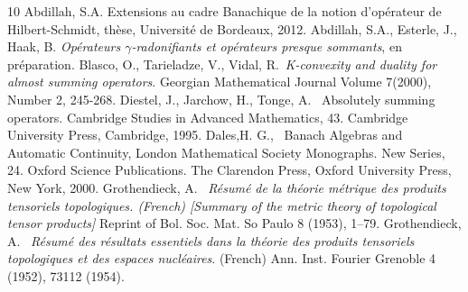 \documentclass{smfart}
\theoremstyle{plain}
\theoremstyle{definition}
\newcommand{\err}{\mathrm{R}}
\begin{document}
\begin{thebibliography}{10}
 Abdillah, S.A. Extensions au cadre Banachique de la notion d'opérateur de Hilbert-Schmidt, thèse, Université de Bordeaux, 2012.
 Abdillah, S.A., Esterle, J., Haak, B. {\it Opérateurs $\gamma$-radonifiants et opérateurs presque sommants}, en préparation.
 Blasco, O., Tarieladze, V., Vidal, R.\ {\it K-convexity and duality for almost summing operators}. Georgian Mathematical Journal Volume 7(2000), Number 2, 245-268.
 Diestel, J., Jarchow, H., Tonge, A. \  Absolutely summing operators. Cambridge Studies in Advanced Mathematics, 43. Cambridge University Press, Cambridge, 1995. 
 Dales,H. G.,  \  Banach Algebras and Automatic Continuity, London Mathematical Society Monographs. New Series, 24. Oxford Science Publications. The Clarendon Press, Oxford University Press, New York, 2000.
 Grothendieck, A. \ {\it Résumé de la théorie métrique des produits tensoriels topologiques. (French) [Summary of the metric theory of topological tensor products]} Reprint of Bol. Soc. Mat. So Paulo 8 (1953), 1--79.
  Grothendieck, A.  \ {\it Résumé des résultats essentiels dans la théorie des produits tensoriels topologiques et des espaces nucléaires}. (French) Ann. Inst. Fourier Grenoble 4 (1952), 73112 (1954).

\end{thebibliography}
\end{document}
